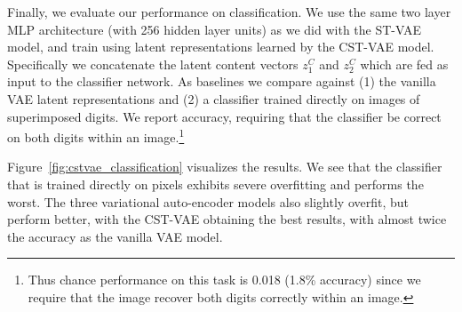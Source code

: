 Finally, we evaluate our performance on classification.
We use the same two layer MLP architecture (with 256 hidden layer units) as we did 
with the ST-VAE model, and train using latent representations
learned by the CST-VAE model.  
Specifically we concatenate the latent content vectors $z^C_1$ and $z^C_2$
which are fed as input to the classifier network.  
As baselines we compare against (1) the vanilla VAE latent representations 
and (2) a classifier trained directly on images of superimposed
digits.  We report accuracy, requiring that the classifier 
be correct on both digits within an image.\footnote{
%
Thus  
 chance performance on this task is 0.018 (1.8\% accuracy) since we
 require that the image recover both digits correctly 
 within an image.
}

Figure~\ref{fig:cstvae_classification} visualizes the results.  
We see that the classifier that is trained directly
on pixels exhibits severe overfitting and performs the worst.  The three variational auto-encoder models also
slightly overfit, but perform better, with the CST-VAE obtaining the
best results, with almost twice the accuracy as the vanilla 
VAE model.

\vspace{-2mm}












